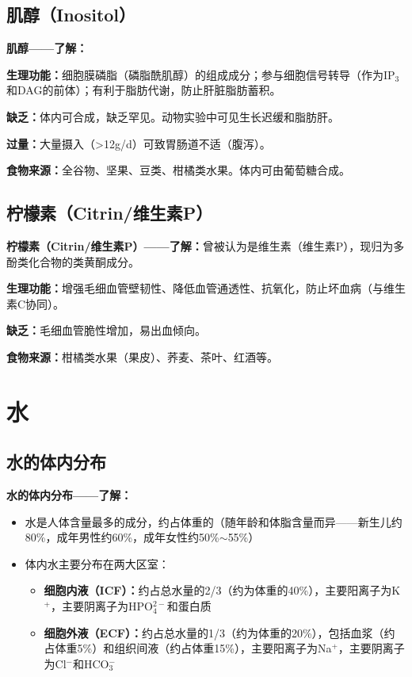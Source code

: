 \subsection{肌醇（Inositol）}

\begin{tipbox}
\textbf{肌醇——了解：}

\textbf{生理功能：}细胞膜磷脂（磷脂酰肌醇）的组成成分；参与细胞信号转导（作为IP$_3$和DAG的前体）；有利于脂肪代谢，防止肝脏脂肪蓄积。

\textbf{缺乏：}体内可合成，缺乏罕见。动物实验中可见生长迟缓和脂肪肝。

\textbf{过量：}大量摄入（>12g/d）可致胃肠道不适（腹泻）。

\textbf{食物来源：}全谷物、坚果、豆类、柑橘类水果。体内可由葡萄糖合成。
\end{tipbox}

\subsection{柠檬素（Citrin/维生素P）}

\begin{tipbox}
\textbf{柠檬素（Citrin/维生素P）——了解：}曾被认为是维生素（维生素P），现归为多酚类化合物的类黄酮成分。

\textbf{生理功能：}增强毛细血管壁韧性、降低血管通透性、抗氧化，防止坏血病（与维生素C协同）。

\textbf{缺乏：}毛细血管脆性增加，易出血倾向。

\textbf{食物来源：}柑橘类水果（果皮）、荞麦、茶叶、红酒等。
\end{tipbox}

\section{水}

\subsection{水的体内分布}

\begin{tipbox}
\textbf{水的体内分布——了解：}
\begin{itemize}[leftmargin=*]
    \item 水是人体含量最多的成分，约占体重的（随年龄和体脂含量而异——新生儿约80\%，成年男性约60\%，成年女性约50\%$\sim$55\%）
    \item 体内水主要分布在两大区室：
    \begin{itemize}[leftmargin=*]
        \item \textbf{细胞内液（ICF）：}约占总水量的2/3（约为体重的40\%），主要阳离子为K$^+$，主要阴离子为HPO$_4^{2-}$和蛋白质
        \item \textbf{细胞外液（ECF）：}约占总水量的1/3（约为体重的20\%），包括血浆（约占体重5\%）和组织间液（约占体重15\%），主要阳离子为Na$^+$，主要阴离子为Cl$^-$和HCO$_3^-$
    \end{itemize}
\end{itemize}
\end{tipbox}

